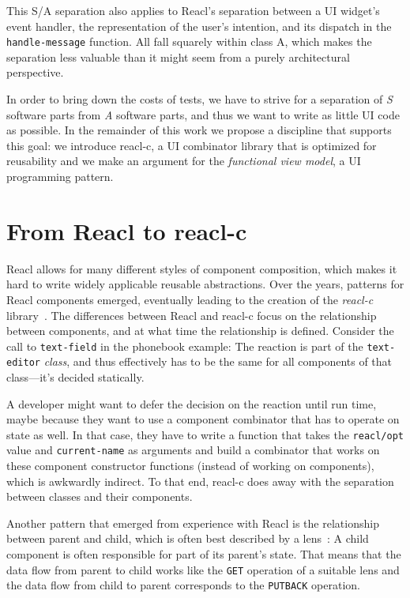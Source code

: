 \documentclass[sigplan,screen]{acmart}
\begin{document}
This S/A separation also applies to Reacl's separation between a UI
widget's event handler, the representation of the user's intention,
and its dispatch in the \texttt{handle-message} function.  All fall
squarely within class A, which makes the separation less valuable than
it might seem from a purely architectural perspective.

In order to bring down the costs of tests, we have to strive for
a separation of \textit{S} software parts from
\textit{A} software parts, and thus we want to write as little
UI code as possible. In the remainder of this work we propose a
discipline that supports this goal: we introduce reacl-c, a UI
combinator library that is optimized for reusability and we make an
argument for the \textit{functional view model}, a UI programming
pattern.

\section{From Reacl to reacl-c}
\label{sec:reacl-c}

Reacl allows for many different styles of component
composition, which makes it hard to write widely applicable reusable
abstractions. Over the years, patterns for
Reacl components emerged, eventually leading to the creation of the \textit{reacl-c}
library~\cite{reacl-c}.
The differences between Reacl and reacl-c focus on the relationship
between components, and at what time the relationship is
defined.  Consider the call to \texttt{text-field} in the
phonebook example:
The reaction is part of the \texttt{text-editor} \emph{class}, and
thus effectively has to be the same for all components of that
class---it's decided statically.

A developer might want to defer the decision on the reaction until run time,
maybe because they want to use a
component combinator that has to operate on state as well.
In that case, they have
to write a function that takes the \texttt{reacl/opt} value and
\texttt{current-name} as arguments and build a combinator
that works on these component constructor functions (instead of
working on components), which is awkwardly indirect.
To that end, reacl-c does away with the
separation between classes and their components.

Another pattern that emerged from experience with Reacl
is the relationship between parent
and child, which is often best described by a lens~\cite{Lenses}:
A child component is often responsible for part of its parent's
state. That means that the data flow from parent to child works like
the \texttt{GET} operation of a suitable lens and the data flow from
child to parent corresponds to the \texttt{PUTBACK} operation.
\end{document}
